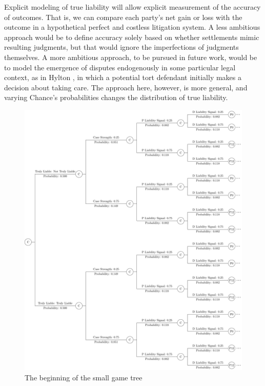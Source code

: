 \documentclass{article}
\begin{document}
Explicit modeling of true liability will allow explicit measurement of the accuracy of outcomes. That is, we can compare each party's net gain or loss with the outcome in a hypothetical perfect and costless litigation system. A less ambitious approach would be to define accuracy solely based on whether settlements mimic resulting judgments, but that would ignore the imperfections of judgments themselves. A more ambitious approach, to be pursued in future work, would be to model the emergence of disputes endogenously in some particular legal context, as in Hylton \cite{hylton}, in which a potential tort defendant initially makes a decision about taking care. The approach here, however, is more general, and varying Chance's probabilities changes the distribution of true liability. 

\begin{figure}[h!]
\centering
\includegraphics[scale=0.25, trim={0in 0in 0in 0in}, clip]{../Figures/game tree 2x2x2 beginning.pdf}
\caption{The beginning of the small game tree}
\label{fig:gametree2x2x2beginning}
\end{figure}
\end{document}
